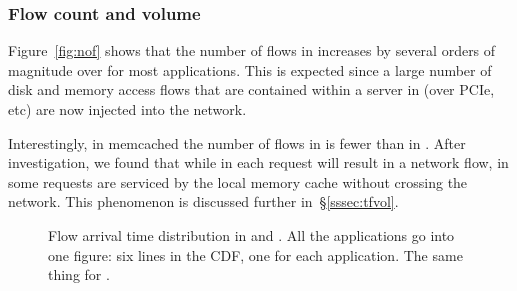 \subsubsection{Flow count and volume}
\label{sssec:fctv}
Figure~\ref{fig:nof} shows that the number of flows in \dis increases by several orders of magnitude over \pdis for most applications. This is expected since a large number of disk and memory access flows that are contained within a server in \pdis (over PCIe, etc) are now injected into the network.

Interestingly, in memcached the number of flows in \dis is fewer than in \pdis. After investigation, we found that while in \pdis each request will result in a network flow, in \dis some requests are serviced by the local memory cache without crossing the network. This phenomenon is discussed further in~\S\ref{sssec:tfvol}.
%
%
\begin{figure}
  \centering
  \caption{\small{Flow arrival time distribution in \dis and \pdis. All the applications go into one figure: six lines in the CDF, one for each application. The same thing for \pdis. }}
  \label{fig:fat}
\end{figure}
%
